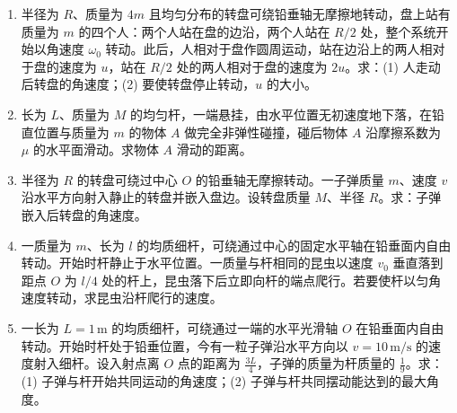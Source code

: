 \documentclass[12pt]{article}
\begin{document}
\begin{enumerate}[label=\textbf{例\arabic*.}, leftmargin=*]
\item 半径为 $R$、质量为 $4m$ 且均匀分布的转盘可绕铅垂轴无摩擦地转动，盘上站有质量为 $m$ 的四个人：两个人站在盘的边沿，两个人站在 $R/2$ 处，整个系统开始以角速度 $\omega_0$ 转动。此后，人相对于盘作圆周运动，站在边沿上的两人相对于盘的速度为 $u$，站在 $R/2$ 处的两人相对于盘的速度为 $2u$。求：(1) 人走动后转盘的角速度；(2) 要使转盘停止转动，$u$ 的大小。

\item 长为 $L$、质量为 $M$ 的均匀杆，一端悬挂，由水平位置无初速度地下落，在铅直位置与质量为 $m$ 的物体 $A$ 做完全非弹性碰撞，碰后物体 $A$ 沿摩擦系数为 $\mu$ 的水平面滑动。求物体 $A$ 滑动的距离。

\item 半径为 $R$ 的转盘可绕过中心 $O$ 的铅垂轴无摩擦转动。一子弹质量 $m$、速度 $v$ 沿水平方向射入静止的转盘并嵌入盘边。设转盘质量 $M$、半径 $R$。求：子弹嵌入后转盘的角速度。

\item 一质量为 $m$、长为 $l$ 的均质细杆，可绕通过中心的固定水平轴在铅垂面内自由转动。开始时杆静止于水平位置。一质量与杆相同的昆虫以速度 $v_0$ 垂直落到距点 $O$ 为 $l/4$ 处的杆上，昆虫落下后立即向杆的端点爬行。若要使杆以匀角速度转动，求昆虫沿杆爬行的速度。

\item 一长为 $L=1\,\mathrm{m}$ 的均质细杆，可绕通过一端的水平光滑轴 $O$ 在铅垂面内自由转动。开始时杆处于铅垂位置，今有一粒子弹沿水平方向以 $v=10\,\mathrm{m/s}$ 的速度射入细杆。设入射点离 $O$ 点的距离为 $\frac{3L}{4}$，子弹的质量为杆质量的 $\frac{1}{9}$。求：(1) 子弹与杆开始共同运动的角速度；(2) 子弹与杆共同摆动能达到的最大角度。

\end{enumerate}
\end{document}
